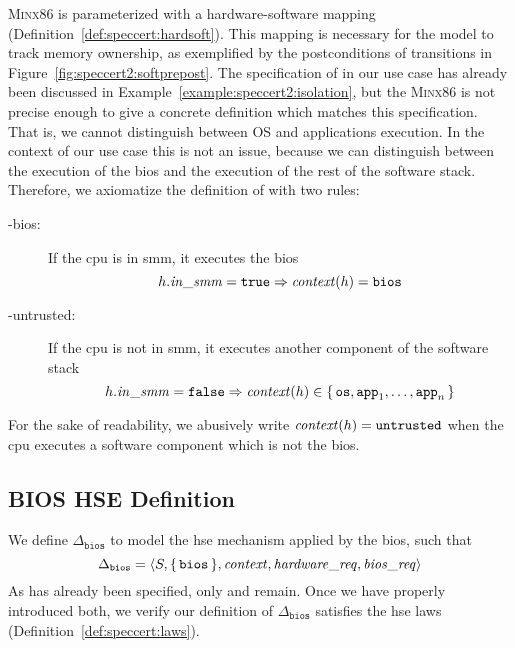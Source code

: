 {\scshape Minx86} is parameterized with a hardware-software mapping
 (Definition~\ref{def:speccert:hardsoft}).
%
This mapping is necessary for the model to track memory ownership, as
exemplified by the postconditions of  transitions in
Figure~\ref{fig:speccert2:softprepost}.
%
The specification of  in our use case has already been discussed
in Example~\ref{example:speccert2:isolation}, but the {\scshape Minx86} is not
precise enough to give a concrete definition which matches this specification.
%
That is, we cannot distinguish between OS and applications execution.
%
In the context of our use case this is not an issue, because we can distinguish
between the execution of the \ac{bios} and the execution of the rest of the
software stack.
%
Therefore, we axiomatize the definition of  with two rules:
%
\begin{description}
\item [-bios:] If the \ac{cpu} is in \ac{smm}, it executes the
  \ac{bios}
  \[
    h.\mathit{in\_smm} = \mathtt{true} \Rightarrow \mathit{context}(h) = \mathtt{bios}
  \]
\item [-untrusted:] If the \ac{cpu} is not in \ac{smm}, it
  executes another component of the software stack
  \[
    h.\mathit{in\_smm} = \mathtt{false} \Rightarrow \mathit{context}(h) \in
    \{\,\mathtt{os}, \mathtt{app}_1, \dots, \mathtt{app}_n\,\}
  \]
\end{description}

For the sake of readability, we abusively write
\( \mathit{context}(h) = \mathtt{untrusted} \) when the \ac{cpu} executes a
software component which is not the \ac{bios}.

\subsection{BIOS HSE Definition}

We define $\Delta_{\mathtt{bios}}$ to model the \ac{hse} mechanism applied by
the \ac{bios}, such that
\[
  \Delta_{\mathtt{bios}} = \langle S, \{\,\mathtt{bios}\,\},
  \mathit{context}, \mathit{hardware\_req}, \mathit{bios\_req} \rangle
\]
%
As  has already been specified, only  and
 remain.
%
Once we have properly introduced both, we verify our definition of
\( \Delta_{\mathtt{bios}} \) satisfies the \ac{hse} laws
(Definition~\ref{def:speccert:laws}).

